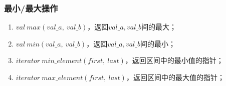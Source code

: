 \subsubsection{最小/最大操作}
\begin{enumerate}
    \item $val\ max(val\_a,\ val\_b)$，返回$val\_a, val\_b$间的最大；
    \item $val\ min(val\_a,\ val\_b)$，返回$val\_a, val\_b$间的最小；
    \item $iterator\ min\_element(first,\ last)$，返回区间中的最小值的指针；
    \item $iterator\ max\_element(first,\ last)$，返回区间中的最大值的指针；
\end{enumerate}